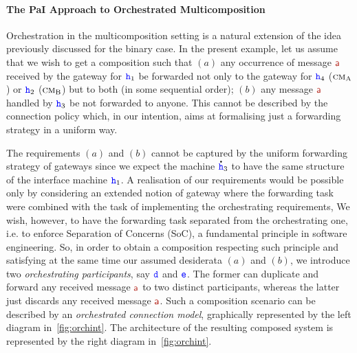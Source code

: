 \paragraph{The PaI Approach to Orchestrated Multicomposition}
Orchestration in the multicomposition setting is a natural extension of the idea
previously discussed for the binary case.  
In the present example, 
let us assume that we wish to get a composition such that 
$(a)$ 
any occurrence of message $\msg[a]$
received by the gateway for ${\mathtt{\color{blue}{ {h}}}}_1$ be forwarded not only to
the gateway for ${\mathtt{\color{blue}{ {h}}}}_4$ ($\text{\sc cm}_\mathrm{A}$) or ${\mathtt{\color{blue}{ {h}}}}_2$ ($\text{\sc cm}_\mathrm{B}$) but to both (in some sequential order);
$(b)$ 
any message $\msg[a]$ handled by ${\mathtt{\color{blue}{ {h}}}}_3$ be not forwarded to anyone.
This cannot be described by the connection policy which, in our intention, aims at
formalising just a forwarding strategy in a uniform way. 



The  requirements $(a)$  and $(b)$  cannot be captured by the uniform forwarding strategy of gateways since
we expect the machine $\accentset{\mbox{\large\bfseries .}}{{ \ensuremath{\mathtt{\color{blue}{ {h}}}} }}_3$ to have the same structure of the interface machine ${\mathtt{\color{blue}{ {h}}}}_1$.
A realisation of our requirements would be possible only
by considering an extended notion of gateway where
the forwarding task were combined with the task of implementing the orchestrating requirements,
We wish, however, to have the forwarding task separated from the orchestrating one, i.e. to enforce Separation of Concerns (SoC), a fundamental principle in software engineering.
So, in order to obtain a composition respecting such principle and satisfying at the same time our assumed desiderata $(a)$ and $(b)$, we introduce two {\em orchestrating participants}, say ${\mathtt{\color{blue}{ {d}}}}$ and ${\mathtt{\color{blue}{ {e}}}}$.
 The former can duplicate and forward any received message $\msg[a]$ to two distinct participants, 
whereas the latter just discards any received message $\msg[a]$.
Such a composition scenario can be described by an {\em orchestrated connection model},
graphically represented by the left diagram in~\cref{fig:orchint}.
 The  architecture of the resulting composed system 
 is represented  by the right diagram in~\cref{fig:orchint}.
 
 
 
